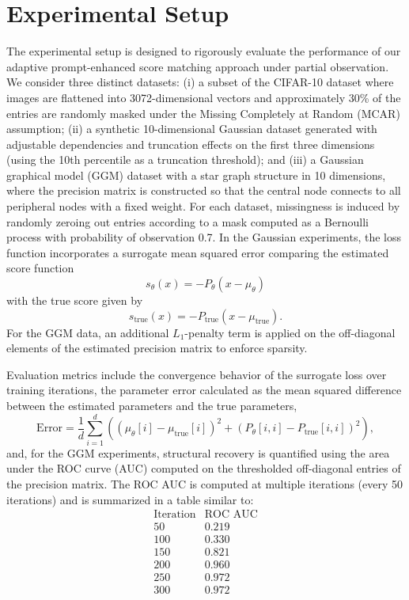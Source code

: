 \documentclass{article}
\begin{document}
\section{Experimental Setup}
The experimental setup is designed to rigorously evaluate the performance of our adaptive prompt-enhanced score matching approach under partial observation. We consider three distinct datasets: (i) a subset of the CIFAR-10 dataset where images are flattened into 3072-dimensional vectors and approximately 30\% of the entries are randomly masked under the Missing Completely at Random (MCAR) assumption; (ii) a synthetic 10-dimensional Gaussian dataset generated with adjustable dependencies and truncation effects on the first three dimensions (using the 10th percentile as a truncation threshold); and (iii) a Gaussian graphical model (GGM) dataset with a star graph structure in 10 dimensions, where the precision matrix is constructed so that the central node connects to all peripheral nodes with a fixed weight. For each dataset, missingness is induced by randomly zeroing out entries according to a mask computed as a Bernoulli process with probability of observation 0.7. In the Gaussian experiments, the loss function incorporates a surrogate mean squared error comparing the estimated score function 
\[
s_\theta(x) = -P_\theta (x - \mu_\theta)
\]
with the true score given by 
\[
s_{\mathrm{true}}(x) = -P_{\mathrm{true}} (x-\mu_{\mathrm{true}}).
\]
For the GGM data, an additional \(L_1\)-penalty term is applied on the off-diagonal elements of the estimated precision matrix to enforce sparsity.

Evaluation metrics include the convergence behavior of the surrogate loss over training iterations, the parameter error calculated as the mean squared difference between the estimated parameters and the true parameters,
\[
\text{Error} = \frac{1}{d} \sum_{i=1}^{d} \left( (\mu_\theta[i]-\mu_{\mathrm{true}}[i])^2 + (P_\theta[i,i]-P_{\mathrm{true}}[i,i])^2 \right),
\]
and, for the GGM experiments, structural recovery is quantified using the area under the ROC curve (AUC) computed on the thresholded off-diagonal entries of the precision matrix. The ROC AUC is computed at multiple iterations (every 50 iterations) and is summarized in a table similar to:
\[
\begin{array}{c|c}
\text{Iteration} & \text{ROC AUC} \\
\hline
50 & 0.219 \\
100 & 0.330 \\
150 & 0.821 \\
200 & 0.960 \\
250 & 0.972 \\
300 & 0.972 \\
\end{array}
\]
\end{document}
